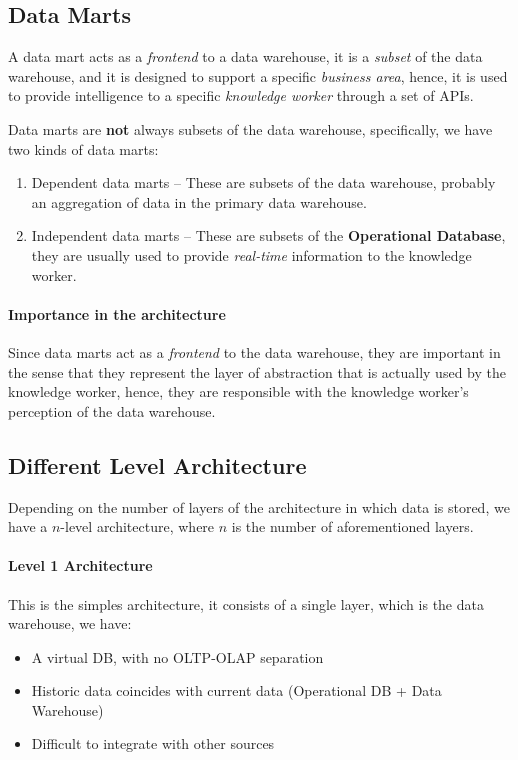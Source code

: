 \documentclass[openright, twoside, twocolumn]{report}
\begin{document}
\subsection{Data Marts}

A data mart acts as a \emph{frontend} to a data warehouse, it is a \emph{subset} of the data warehouse,
and it is designed to support a specific \emph{business area}, hence, it is used
to provide intelligence to a specific \emph{knowledge worker} through a set of APIs.

Data marts are \textbf{not} always subsets of the data warehouse, specifically, we
have two kinds of data marts:

\begin{enumerate}
  \item Dependent data marts -- These are subsets of the data warehouse, probably
  an aggregation of data in the primary data warehouse.
  \item Independent data marts -- These are subsets of the \textbf{Operational Database},
  they are usually used to provide \emph{real-time} information to the knowledge worker.
\end{enumerate}

\paragraph{Importance in the architecture}

Since data marts act as a \emph{frontend} to the data warehouse, they are important
in the sense that they represent the layer of abstraction that is actually
used by the knowledge worker, hence, they are responsible with the knowledge worker's
perception of the data warehouse.

\subsection{Different Level Architecture}
Depending on the number of layers of the architecture in which data
is stored, we have a $n$-level architecture, where $n$ is the number of aforementioned layers.

\paragraph{Level 1 Architecture}

This is the simples architecture, it consists of a single layer, which is the
data warehouse, we have:

\begin{itemize}
  \item A virtual DB, with no OLTP-OLAP separation
  \item Historic data coincides with current data (Operational DB + Data Warehouse)
  \item Difficult to integrate with other sources
\end{itemize}
\end{document}
